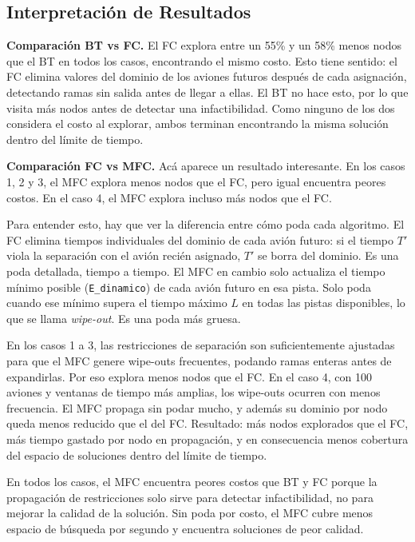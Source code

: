 \documentclass[12pt]{article}
\begin{document}
\subsection{Interpretación de Resultados}

\textbf{Comparación BT vs FC.} El FC explora entre un 55\% y un 58\% menos nodos que el BT en todos los casos, encontrando el mismo costo. Esto tiene sentido: el FC elimina valores del dominio de los aviones futuros después de cada asignación, detectando ramas sin salida antes de llegar a ellas. El BT no hace esto, por lo que visita más nodos antes de detectar una infactibilidad. Como ninguno de los dos considera el costo al explorar, ambos terminan encontrando la misma solución dentro del límite de tiempo.

\textbf{Comparación FC vs MFC.} Acá aparece un resultado interesante. En los casos 1, 2 y 3, el MFC explora menos nodos que el FC, pero igual encuentra peores costos. En el caso 4, el MFC explora incluso más nodos que el FC.

Para entender esto, hay que ver la diferencia entre cómo poda cada algoritmo. El FC elimina tiempos individuales del dominio de cada avión futuro: si el tiempo $T'$ viola la separación con el avión recién asignado, $T'$ se borra del dominio. Es una poda detallada, tiempo a tiempo. El MFC en cambio solo actualiza el tiempo mínimo posible (\texttt{E\_dinamico}) de cada avión futuro en esa pista. Solo poda cuando ese mínimo supera el tiempo máximo $L$ en todas las pistas disponibles, lo que se llama \textit{wipe-out}. Es una poda más gruesa.

En los casos 1 a 3, las restricciones de separación son suficientemente ajustadas para que el MFC genere wipe-outs frecuentes, podando ramas enteras antes de expandirlas. Por eso explora menos nodos que el FC. En el caso 4, con 100 aviones y ventanas de tiempo más amplias, los wipe-outs ocurren con menos frecuencia. El MFC propaga sin podar mucho, y además su dominio por nodo queda menos reducido que el del FC. Resultado: más nodos explorados que el FC, más tiempo gastado por nodo en propagación, y en consecuencia menos cobertura del espacio de soluciones dentro del límite de tiempo.

En todos los casos, el MFC encuentra peores costos que BT y FC porque la propagación de restricciones solo sirve para detectar infactibilidad, no para mejorar la calidad de la solución. Sin poda por costo, el MFC cubre menos espacio de búsqueda por segundo y encuentra soluciones de peor calidad.
\end{document}
